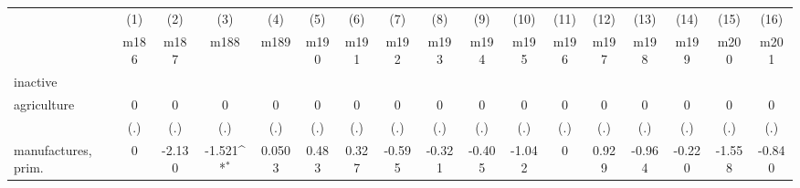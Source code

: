 {
\def\sym#1{\ifmmode^{#1}\else\(^{#1}\)\fi}
\begin{tabular}{l*{16}{c}}
\hline\hline
                    &\multicolumn{1}{c}{(1)}&\multicolumn{1}{c}{(2)}&\multicolumn{1}{c}{(3)}&\multicolumn{1}{c}{(4)}&\multicolumn{1}{c}{(5)}&\multicolumn{1}{c}{(6)}&\multicolumn{1}{c}{(7)}&\multicolumn{1}{c}{(8)}&\multicolumn{1}{c}{(9)}&\multicolumn{1}{c}{(10)}&\multicolumn{1}{c}{(11)}&\multicolumn{1}{c}{(12)}&\multicolumn{1}{c}{(13)}&\multicolumn{1}{c}{(14)}&\multicolumn{1}{c}{(15)}&\multicolumn{1}{c}{(16)}\\
                    &\multicolumn{1}{c}{m186}&\multicolumn{1}{c}{m187}&\multicolumn{1}{c}{m188}&\multicolumn{1}{c}{m189}&\multicolumn{1}{c}{m190}&\multicolumn{1}{c}{m191}&\multicolumn{1}{c}{m192}&\multicolumn{1}{c}{m193}&\multicolumn{1}{c}{m194}&\multicolumn{1}{c}{m195}&\multicolumn{1}{c}{m196}&\multicolumn{1}{c}{m197}&\multicolumn{1}{c}{m198}&\multicolumn{1}{c}{m199}&\multicolumn{1}{c}{m200}&\multicolumn{1}{c}{m201}\\
\hline
inactive            &                     &                     &                     &                     &                     &                     &                     &                     &                     &                     &                     &                     &                     &                     &                     &                     \\
agriculture         &           0         &           0         &           0         &           0         &           0         &           0         &           0         &           0         &           0         &           0         &           0         &           0         &           0         &           0         &           0         &           0         \\
                    &         (.)         &         (.)         &         (.)         &         (.)         &         (.)         &         (.)         &         (.)         &         (.)         &         (.)         &         (.)         &         (.)         &         (.)         &         (.)         &         (.)         &         (.)         &         (.)         \\
[1em]
manufactures, prim. &           0         &      -2.130         &      -1.521\sym{*}  &      0.0503         &       0.483         &       0.327         &      -0.595         &      -0.321         &      -0.405         &      -1.042         &           0         &       0.929         &      -0.964         &      -0.220         &      -1.558         &      -0.840         \\

\end{tabular}}
